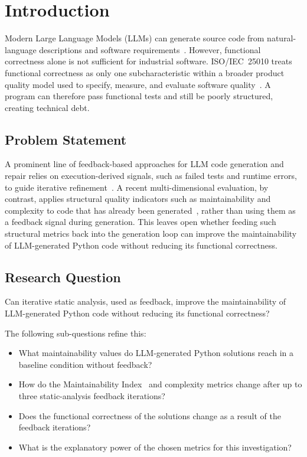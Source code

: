 
\section{Introduction}
\label{sec:intro}

Modern Large Language Models (LLMs) can generate source code from
natural-language descriptions and software requirements~\citep{han2024archcode}.
However, functional correctness alone is not sufficient for industrial software.
ISO/IEC~25010 treats functional correctness as only one subcharacteristic within
a broader product quality model used to specify, measure, and evaluate software
quality~\citep{iso25010}. A program can therefore pass functional tests and
still be poorly structured, creating technical debt.

\subsection{Problem Statement}
A prominent line of feedback-based approaches for LLM code generation and repair
relies on execution-derived signals, such as failed tests and runtime
errors, to guide iterative refinement~\citep{chen2024selfdebug}.
A recent multi-dimensional evaluation, by contrast, applies structural quality
indicators such as maintainability and complexity to code that has already been
generated~\citep{li2026multidim},
rather than using them as a feedback signal during generation. This leaves open whether feeding
such structural metrics back into the generation loop can improve the
maintainability of LLM-generated Python code without reducing its functional
correctness.

\subsection{Research Question}
Can iterative static analysis, used as feedback, improve the maintainability of
LLM-generated Python code without reducing its functional correctness?

\noindent The following sub-questions refine this:
\begin{itemize}
  \item What maintainability values do LLM-generated Python solutions reach in a
    baseline condition without feedback?
  \item How do the Maintainability Index~\citep{coleman1994maintainability} and
    complexity metrics change after up
    to three static-analysis feedback iterations?
  \item Does the functional correctness of the solutions change as a result of
    the feedback iterations?
  \item What is the explanatory power of the chosen metrics for this
    investigation?
\end{itemize}

